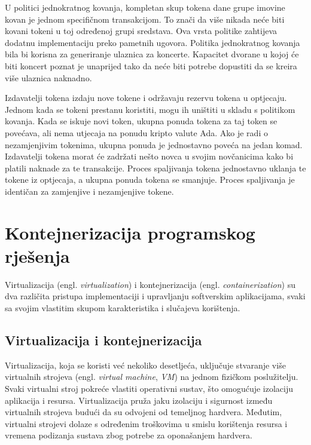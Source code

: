 \documentclass[times, utf8, diplomski]{fer}
\begin{document}
U politici jednokratnog kovanja, kompletan skup tokena dane grupe imovine kovan je jednom specifičnom transakcijom. To znači da više nikada neće biti kovani tokeni u toj određenoj grupi sredstava. Ova vrsta politike zahtijeva dodatnu implementaciju preko pametnih ugovora. Politika jednokratnog kovanja bila bi korisna za generiranje ulaznica za koncerte. Kapacitet dvorane u kojoj će biti koncert poznat je unaprijed tako da neće biti potrebe dopustiti da se kreira više ulaznica naknadno.

Izdavatelji tokena izdaju nove tokene i održavaju rezervu tokena u optjecaju. Jednom kada se tokeni prestanu koristiti, mogu ih uništiti u skladu s politikom kovanja. Kada se iskuje novi token, ukupna ponuda tokena za taj token se povećava, ali nema utjecaja na ponudu kripto valute Ada. Ako je radi o nezamjenjivim tokenima, ukupna ponuda je jednostavno poveća na jedan komad. Izdavatelji tokena morat će zadržati nešto novca u svojim novčanicima kako bi platili naknade za te transakcije. Proces spaljivanja tokena jednostavno uklanja te tokene iz optjecaja, a ukupna ponuda tokena se smanjuje. Proces spaljivanja je identičan za zamjenjive i nezamjenjive tokene.

\section{Kontejnerizacija programskog rješenja}

Virtualizacija (engl. \emph{virtualization}) i kontejnerizacija (engl. \emph{containerization}) su dva različita pristupa implementaciji i upravljanju softverskim aplikacijama, svaki sa svojim vlastitim skupom karakteristika i slučajeva korištenja. 

\subsection{Virtualizacija i kontejnerizacija}

Virtualizacija, koja se koristi već nekoliko desetljeća, uključuje stvaranje više virtualnih strojeva (engl. \emph{virtual machine}, \emph{VM}) na jednom fizičkom poslužitelju. Svaki virtualni stroj pokreće vlastiti operativni sustav, što omogućuje izolaciju aplikacija i resursa. Virtualizacija pruža jaku izolaciju i sigurnost između virtualnih strojeva budući da su odvojeni od temeljnog hardvera. Međutim, virtualni strojevi dolaze s određenim troškovima u smislu korištenja resursa i vremena podizanja sustava zbog potrebe za oponašanjem hardvera.
\end{document}
